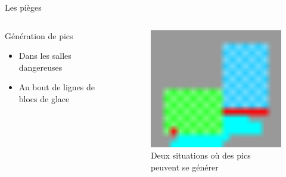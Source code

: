 \documentclass{beamer}
\begin{document}
{\begin{frame}{Les pièges}
    \begin{columns}
        \begin{block}{Génération de pics}
            \begin{itemize}
                \item[\bullet] Dans les salles dangereuses
                \item[\bullet] Au bout de lignes de blocs de glace
            \end{itemize}
        \end{block}
        \begin{figure}
            \centering
            \includegraphics[width=1.0\textwidth]{images/ice_spike_trap}
            \caption{Deux situations où des pics peuvent se générer}
        \end{figure}
    \end{columns}
\end{frame}

}
\end{document}
